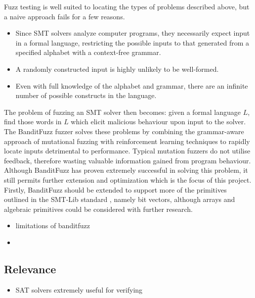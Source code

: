 \documentclass[article,11pt]{article}
\begin{document}
Fuzz testing is well suited to locating the types of problems described above, but a naive approach fails for a few reasons.\\
\begin{itemize}
\item Since SMT solvers analyze computer programs, they necessarily expect input in a formal language, restricting the possible inputs to that generated from a specified alphabet with a context-free grammar.\\
\item A randomly constructed input is highly unlikely to be well-formed.\\
\item Even with full knowledge of the alphabet and grammar, there are an infinite number of possible constructs in the language.\\
\end{itemize}
The problem of fuzzing an SMT solver then becomes: given a formal language \(L\), find those words in \(L\) which elicit malicious behaviour upon input to the solver.\\
The BanditFuzz\cite{bandit} fuzzer solves these problems by combining the grammar-aware approach of mutational fuzzing with reinforcement learning techniques to rapidly locate inputs detrimental to performance. Typical mutation fuzzers do not utilise feedback, therefore wasting valuable information gained from program behaviour.\\
Although BanditFuzz has proven extremely successful in solving this problem, it still permits further extension and optimization which is the focus of this project.\\
Firstly, BanditFuzz should be extended to support more of the primitives outlined in the SMT-Lib standard \cite{SMT}, namely bit vectors, although arrays and algebraic primitives could be considered with further research.\\

\begin{itemize}
\item limitations of banditfuzz\\
\item 
\end{itemize}

\subsection*{Relevance}
\label{sec:org86f6410}
\begin{itemize}
\item SAT solvers extremely useful for verifying\\
\end{itemize}
\end{document}
